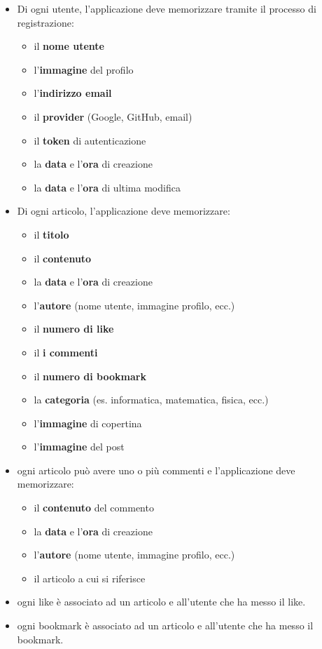 \documentclass{article}
\begin{document}
\begin{itemize}
    \item Di ogni utente, l'applicazione deve memorizzare tramite il processo di registrazione:
    \begin{itemize}
        \item il \textbf{nome utente}
        \item l'\textbf{immagine} del profilo
        \item l'\textbf{indirizzo email}
        \item il \textbf{provider} (Google, GitHub, email)
        \item il \textbf{token} di autenticazione
        \item la \textbf{data} e l'\textbf{ora} di creazione
        \item la \textbf{data} e l'\textbf{ora} di ultima modifica
    \end{itemize}
    \item Di ogni articolo, l'applicazione deve memorizzare:
    \begin{itemize}
        \item il \textbf{titolo}
        \item il \textbf{contenuto}
        \item la \textbf{data} e l'\textbf{ora} di creazione
        \item l'\textbf{autore} (nome utente, immagine profilo, ecc.)
        \item il \textbf{numero di like}
        \item il \textbf{i commenti}
        \item il \textbf{numero di bookmark}
        \item la \textbf{categoria} (es. informatica, matematica, fisica, ecc.)
        \item l'\textbf{immagine} di copertina
        \item l'\textbf{immagine} del post
    \end{itemize}
    \item ogni articolo può avere uno o più commenti e l'applicazione deve memorizzare:
    \begin{itemize}
        \item il \textbf{contenuto} del commento
        \item la \textbf{data} e l'\textbf{ora} di creazione
        \item l'\textbf{autore} (nome utente, immagine profilo, ecc.)
        \item il articolo a cui si riferisce
    \end{itemize}
    \item ogni like è associato ad un articolo e all'utente che ha messo il like.\\
    \item ogni bookmark è associato ad un articolo e all'utente che ha messo il bookmark.
\end{itemize}
\end{document}
